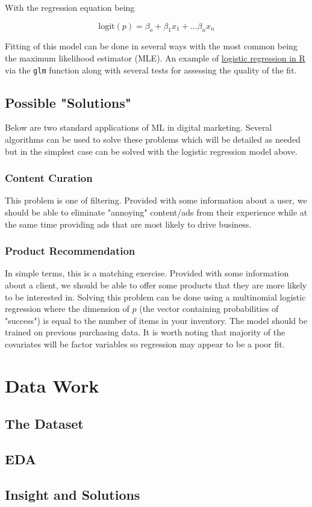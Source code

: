 \documentclass[12pt,a4paper]{book}
\newcommand{\logit}{\text{logit}}
\begin{document}
With the regression equation being

\begin{equation}
    \logit(p) = \beta_o + \beta_1 x_1 + \ldots \beta_n x_n
\end{equation}

Fitting of this model can be done in several ways with the most common being the maximum likelihood estimator (MLE). An example of \href{https://stats.idre.ucla.edu/r/dae/logit-regression/}{logistic regression in R} via the \texttt{glm} function along with several tests for assessing the quality of the fit. 

\section{Possible "Solutions"}

Below are two standard applications of ML in digital marketing. Several algorithms can be used to solve these problems which will be detailed as needed but in the simplest case can be solved with the logistic regression model above. 

\subsection{Content Curation}
This problem is one of filtering. Provided with some information about a user, we should be able to eliminate "annoying" content/ads from their experience while at the same time providing ads that are most likely to drive business. 

\subsection{Product Recommendation}
In simple terms, this is a matching exercise. Provided with some information about a client, we should be able to offer some products that they are more likely to be interested in. Solving this problem can be done using a multinomial logistic regression where the dimension of $p$ (the vector containing probabilities of "success") is equal to the number of items in your inventory. The model should be trained on previous purchasing data. It is worth noting that majority of the covariates will be factor variables so regression may appear to be a poor fit. 

\chapter{Data Work}

\section{The Dataset}

\section{EDA}

\section{Insight and Solutions}
\end{document}
